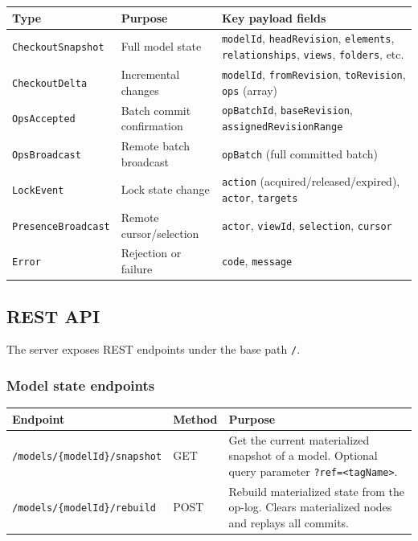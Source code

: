 \begin{longtable}{p{36mm}p{52mm}p{66mm}}
\toprule
Type & Purpose & Key payload fields \\
\midrule
\texttt{CheckoutSnapshot} & Full model state &
  \texttt{modelId}, \texttt{headRevision},
  \texttt{elements}, \texttt{relationships},
  \texttt{views}, \texttt{folders}, etc. \\
\texttt{CheckoutDelta} & Incremental changes &
  \texttt{modelId},
  \texttt{fromRevision}, \texttt{toRevision},
  \texttt{ops} (array) \\
\texttt{OpsAccepted} & Batch commit confirmation &
  \texttt{opBatchId}, \texttt{baseRevision},
  \texttt{assignedRevisionRange} \\
\texttt{OpsBroadcast} & Remote batch broadcast &
  \texttt{opBatch} (full committed batch) \\
\texttt{LockEvent} & Lock state change &
  \texttt{action} (acquired/released/expired),
  \texttt{actor}, \texttt{targets} \\
\texttt{PresenceBroadcast} & Remote cursor/selection &
  \texttt{actor}, \texttt{viewId},
  \texttt{selection}, \texttt{cursor} \\
\texttt{Error} & Rejection or failure &
  \texttt{code}, \texttt{message} \\
\bottomrule
\end{longtable}

\subsection{REST API}

The server exposes REST endpoints under the base path \texttt{/}.

\subsubsection{Model state endpoints}

\begin{longtable}{p{54mm}p{44mm}p{56mm}}
\toprule
Endpoint & Method & Purpose \\
\midrule
\texttt{/models/\{modelId\}/snapshot} & GET & Get the current materialized
  snapshot of a model. Optional query parameter \texttt{?ref=<tagName>}. \\
\texttt{/models/\{modelId\}/rebuild} & POST & Rebuild materialized state
  from the op-log. Clears materialized nodes and replays all commits. \\
\bottomrule
\end{longtable}


